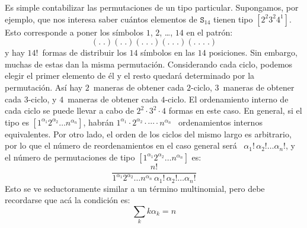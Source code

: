   Es simple contabilizar las permutaciones de un tipo particular.%
  Supongamos,
  por ejemplo,
  que nos interesa saber cuántos elementos de \(\mathtt{S}_{14}\)
  tienen tipo \([2^2 3^2 4^1]\).
  Esto corresponde a poner
  los símbolos \(1\), \(2\), \ldots, \(14\) en el patrón:
  \begin{equation*}
    (.\;.) (.\;.) (.\;.\;.) (.\;.\;.) (.\;.\;.\;.)
  \end{equation*}
  y hay \(14!\)~formas
  de distribuir los \(14\) símbolos en las \(14\) posiciones.
  Sin embargo,
  muchas de estas dan la misma permutación.
  Considerando cada ciclo,
  podemos elegir el primer elemento de él
  y el resto quedará determinado por la permutación.
  Así hay \(2\)~maneras de obtener cada \(2\)\nobreakdash-ciclo,
  \(3\)~maneras de obtener cada \(3\)\nobreakdash-ciclo,
  y \(4\)~maneras de obtener cada \(4\)\nobreakdash-ciclo.
  El ordenamiento interno de cada ciclo se puede llevar a cabo
  de \(2^2 \cdot 3^2 \cdot 4\) formas en este caso.
  En general,
  si el tipo es \([1^{\alpha_1} 2^{\alpha_2} \dotso n^{\alpha_n}]\),
  habrán \(1^{\alpha_1} \cdot 2^{\alpha_2}
	     \cdot \dotsm \cdot n^{\alpha_n}\)~%
  ordenamientos internos equivalentes.
  Por otro lado,
  el orden de los ciclos del mismo largo es arbitrario,
  por lo que el número de reordenamientos en el caso general será~%
  \(\alpha_1 ! \, \alpha_2 ! \dotso \alpha_n !\),
  y el número de permutaciones
  de tipo \([1^{\alpha_1} 2^{\alpha_2} \dotso n^{\alpha_n}]\) es:
  \begin{equation*}
    \frac{n!}{1^{\alpha_1} 2^{\alpha_2} \dotso n^{\alpha_n} \,
	      \alpha_1 ! \, \alpha_2 ! \dotso \alpha_n !}
  \end{equation*}
  Esto se ve seductoramente similar a un término multinomial,
  pero debe recordarse que acá la condición es:
  \begin{equation*}
    \sum_k k \alpha_k = n
  \end{equation*}



